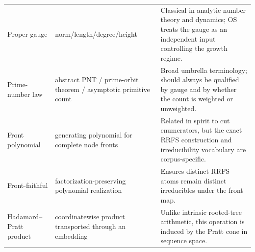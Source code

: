 \documentclass[11pt]{article}
\begin{document}
\begin{longtable}{>{\raggedright\arraybackslash}p{}>{\raggedright\arraybackslash}p{}>{\raggedright\arraybackslash}p{}}
Proper gauge & norm/length/degree/height & Classical in analytic number theory and dynamics; OS treats the gauge as an independent input controlling the growth regime.\\
Prime-number law & abstract PNT / prime-orbit theorem / asymptotic primitive count & Broad umbrella terminology; should always be qualified by gauge and by whether the count is weighted or unweighted.\\
Front polynomial & generating polynomial for complete node fronts & Related in spirit to cut enumerators, but the exact RRFS construction and irreducibility vocabulary are corpus-specific.\\
Front-faithful & factorization-preserving polynomial realization & Ensures distinct RRFS atoms remain distinct irreducibles under the front map.\\
Hadamard--Pratt product & coordinatewise product transported through an embedding & Unlike intrinsic rooted-tree arithmetic, this operation is induced by the Pratt cone in sequence space.\\
\bottomrule
\end{longtable}
\normalsize
\end{document}
